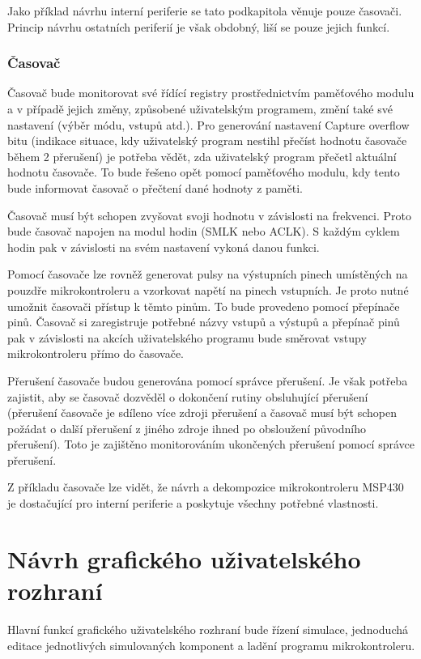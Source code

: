 Jako příklad návrhu interní periferie se tato podkapitola věnuje pouze časovači. Princip návrhu ostatních periferií je však obdobný, liší se pouze jejich funkcí.

\subsubsection{Časovač}

Časovač bude monitorovat své řídící registry prostřednictvím paměťového modulu a v případě jejich změny, způsobené uživatelským programem, změní také své nastavení (výběr módu, vstupů atd.). Pro generování nastavení Capture overflow bitu (indikace situace, kdy uživatelský program nestihl přečíst hodnotu časovače během 2 přerušení) je potřeba vědět, zda uživatelský program přečetl aktuální hodnotu časovače. To bude řešeno opět pomocí paměťového modulu, kdy tento bude informovat časovač o přečtení dané hodnoty z paměti.

Časovač musí být schopen zvyšovat svoji hodnotu v závislosti na frekvenci. Proto bude časovač napojen na modul hodin (SMLK nebo ACLK). S každým cyklem
hodin pak v závislosti na svém nastavení vykoná danou funkci.

Pomocí časovače lze rovněž generovat pulsy na výstupních pinech umístěných na pouzdře mikrokontroleru a vzorkovat napětí na pinech vstupních.
Je proto nutné umožnit časovači přístup k těmto pinům. To bude provedeno pomocí přepínače pinů. Časovač si zaregistruje potřebné názvy vstupů a výstupů
a přepínač pinů pak v závislosti na akcích uživatelského programu bude směrovat vstupy mikrokontroleru přímo do časovače.

Přerušení časovače budou generována pomocí správce přerušení. Je však potřeba zajistit, aby se časovač dozvěděl o dokončení rutiny obsluhující přerušení
(přerušení časovače je sdíleno více zdroji přerušení a časovač musí být schopen požádat o další přerušení z jiného zdroje ihned po obsloužení původního přerušení). Toto je zajištěno monitorováním ukončených přerušení pomocí správce přerušení.

Z příkladu časovače lze vidět, že návrh a dekompozice mikrokontroleru MSP430 je dostačující pro interní periferie a poskytuje všechny potřebné vlastnosti.

\section{Návrh grafického uživatelského rozhraní}

Hlavní funkcí grafického uživatelského rozhraní bude řízení simulace, jednoduchá editace jednotlivých simulovaných komponent a ladění programu mikrokontroleru.

